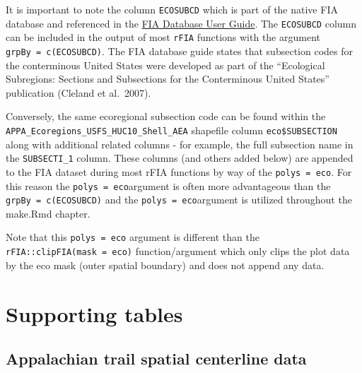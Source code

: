 \documentclass[
]{book}
\begin{document}
It is important to note the column \texttt{ECOSUBCD} which is part of the native FIA database and referenced in the \href{https://www.fs.usda.gov/research/understory/forest-inventory-and-analysis-database-user-guide-phase-2}{FIA Database User Guide}. The \texttt{ECOSUBCD} column can be included in the output of most \texttt{rFIA} functions with the argument \texttt{grpBy\ =\ c(ECOSUBCD)}. The FIA database guide states that subsection codes for the conterminous United States were developed as part of the ``Ecological Subregions: Sections and Subsections for the Conterminous United States'' publication (Cleland et al.~2007).

Conversely, the same ecoregional subsection code can be found within the \texttt{APPA\_Ecoregions\_USFS\_HUC10\_Shell\_AEA} shapefile column \texttt{eco\$SUBSECTION} along with additional related columns - for example, the full subsection name in the \texttt{SUBSECTI\_1} column. These columns (and others added below) are appended to the FIA dataset during most rFIA functions by way of the \texttt{polys\ =\ eco}. For this reason the \texttt{polys\ =\ eco}argument is often more advantageous than the \texttt{grpBy\ =\ c(ECOSUBCD)} and the \texttt{polys\ =\ eco}argument is utilized throughout the make.Rmd chapter.

Note that this \texttt{polys\ =\ eco} argument is different than the \texttt{rFIA::clipFIA(mask\ =\ eco)} function/argument which only clips the plot data by the eco mask (outer spatial boundary) and does not append any data.

\hypertarget{supporting-tables}{%
\section{Supporting tables}\label{supporting-tables}}

\hypertarget{appalachian-trail-spatial-centerline-data}{%
\subsection{Appalachian trail spatial centerline data}\label{appalachian-trail-spatial-centerline-data}}
\end{document}
